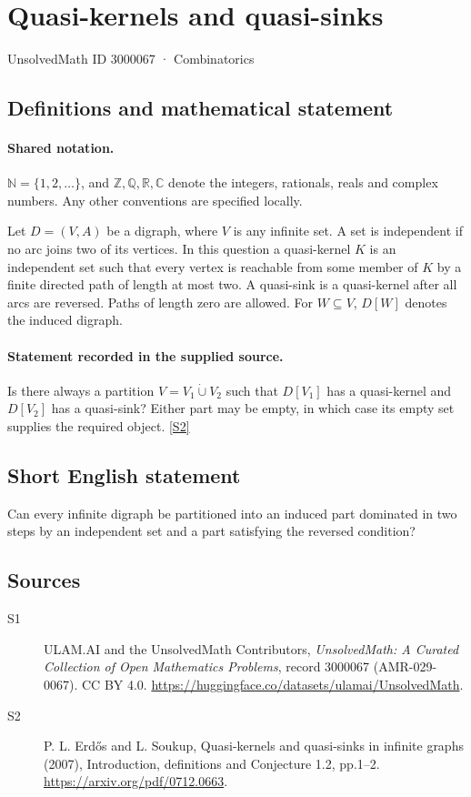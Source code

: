 \documentclass[11pt]{article}
\newcommand{\sref}[2]{\hyperlink{source:#1:#2}{[S#2]}}
\begin{document}
\setcounter{section}{3000066}
\section{Quasi-kernels and quasi-sinks}\label{3000067}
{\small\sffamily UnsolvedMath ID 3000067 · Combinatorics}
\subsection{Definitions and mathematical statement}

\paragraph{Shared notation.}$\mathbb N=\{1,2,\ldots\}$, and $\mathbb Z,\mathbb Q,\mathbb R,\mathbb C$ denote the integers, rationals, reals and complex numbers. Any other conventions are specified locally.


Let $D=(V,A)$ be a digraph, where $V$ is any infinite set. A set is independent if no arc joins two of its vertices. In this question a quasi-kernel $K$ is an independent set such that every vertex is reachable from some member of $K$ by a finite directed path of length at most two. A quasi-sink is a quasi-kernel after all arcs are reversed. Paths of length zero are allowed. For $W\subseteq V$, $D[W]$ denotes the induced digraph.
\paragraph{Statement recorded in the supplied source.}
Is there always a partition $V=V_1\dot\cup V_2$ such that $D[V_1]$ has a quasi-kernel and $D[V_2]$ has a quasi-sink? Either part may be empty, in which case its empty set supplies the required object. \sref{3000067}{2}
\subsection{Short English statement}
Can every infinite digraph be partitioned into an induced part dominated in two steps by an independent set and a part satisfying the reversed condition?
\subsection{Sources}
\begin{description}
\item[\hypertarget{source:3000067:1}{S1}] ULAM.AI and the UnsolvedMath Contributors, \emph{UnsolvedMath: A Curated Collection of Open Mathematics Problems}, record 3000067 (AMR-029-0067). CC BY 4.0. \url{https://huggingface.co/datasets/ulamai/UnsolvedMath}.
\item[\hypertarget{source:3000067:2}{S2}] P. L. Erdős and L. Soukup, Quasi-kernels and quasi-sinks in infinite graphs (2007), Introduction, definitions and Conjecture 1.2, pp.1--2. \url{https://arxiv.org/pdf/0712.0663}.
\end{description}
\label{end:3000067}
\end{document}
